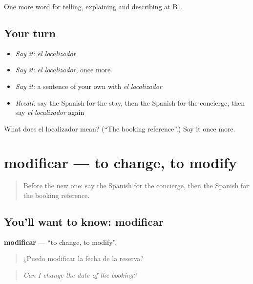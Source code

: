 \begin{grammarlens}[title={What you've built}]
One more word for telling, explaining and describing at B1.
\end{grammarlens}

\subsection*{Your turn}
\begin{itemize}
\raggedright
  \item \emph{Say it:} \emph{el localizador}
  \item \emph{Say it:} \emph{el localizador}, once more
  \item \emph{Say it:} a sentence of your own with \emph{el localizador}
  \item \emph{Recall:} say the Spanish for the stay, then the Spanish for the concierge, then say \emph{el localizador} again
\end{itemize}

\begin{tcolorbox}[breakable,colback=teal!4,colframe=teal!35!black,title={Before you move on}]
What does el localizador mean? (\textquotedblleft{}The booking reference\textquotedblright{}.) Say it once more.
\end{tcolorbox}
\section[modificar]{modificar — to change, to modify}

\label{lesson:ES-C662-modificar}



\begin{quote}
Before the new one: say the Spanish for the concierge, then the Spanish for the booking reference.
\end{quote}

\subsection*{You'll want to know: modificar}
\textbf{modificar} — \textquotedblleft{}to change, to modify\textquotedblright{}.

\begin{quote}
¿Puedo modificar la fecha de la reserva?
\end{quote}

\begin{quote}
\emph{Can I change the date of the booking?}
\end{quote}

